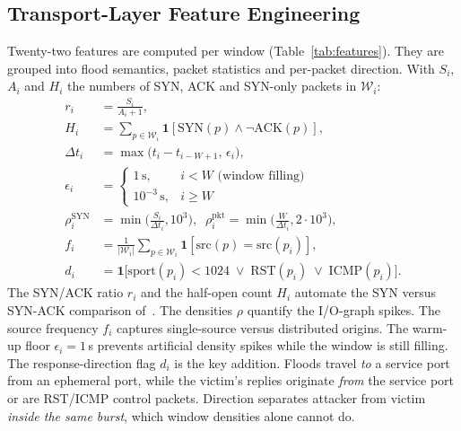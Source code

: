 \documentclass[conference]{IEEEtran}
\begin{document}
\subsection{Transport-Layer Feature Engineering}
Twenty-two features are computed per window (Table~\ref{tab:features}). They are grouped into flood semantics, packet statistics and per-packet direction. With $S_i$, $A_i$ and $H_i$ the numbers of SYN, ACK and SYN-only packets in $\mathcal{W}_i$:
\begin{align}
  r_i &= \frac{S_i}{A_i+1},\\
  H_i &= \textstyle\sum_{p\in\mathcal{W}_i}\mathbf{1}[\mathrm{SYN}(p)\wedge\neg\mathrm{ACK}(p)],\\
  \Delta t_i &= \max\!\big(t_i-t_{i-W+1},\,\epsilon_i\big),\\
  \epsilon_i &= \begin{cases}1\,\mathrm{s}, & i<W \text{ (window filling)}\\ 10^{-3}\,\mathrm{s}, & i\ge W\end{cases}\\
  \rho^{\mathrm{SYN}}_i &= \min\!\Big(\frac{S_i}{\Delta t_i},10^3\Big),\;\;
  \rho^{\mathrm{pkt}}_i = \min\!\Big(\frac{W}{\Delta t_i},2\!\cdot\!10^3\Big),\\
  f_i &= \frac{1}{|\mathcal{W}_i|}\textstyle\sum_{p\in\mathcal{W}_i}\mathbf{1}[\mathrm{src}(p)=\mathrm{src}(p_i)],\\
  d_i &= \mathbf{1}\big[\mathrm{sport}(p_i)<1024\;\vee\;\mathrm{RST}(p_i)\;\vee\;\mathrm{ICMP}(p_i)\big].
  \label{eq:direction}
\end{align}
The SYN/ACK ratio $r_i$ and the half-open count $H_i$ automate the SYN versus SYN-ACK comparison of~\cite{naing2023}. The densities $\rho$ quantify the I/O-graph spikes. The source frequency $f_i$ captures single-source versus distributed origins. The warm-up floor $\epsilon_i=1$\,s prevents artificial density spikes while the window is still filling. The response-direction flag $d_i$ is the key addition. Floods travel \emph{to} a service port from an ephemeral port, while the victim's replies originate \emph{from} the service port or are RST/ICMP control packets. Direction separates attacker from victim \emph{inside the same burst}, which window densities alone cannot do.
\end{document}
